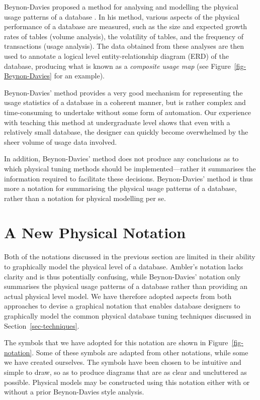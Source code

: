 \documentclass{CRPITStyle}
\begin{document}
Beynon-Davies proposed a method for analysing and modelling the physical
usage patterns of a database \cite{BeDa-P-1992-PDD}. In his method,
various aspects of the physical performance of a database are measured,
such as the size and expected growth rates of tables (volume analysis),
the volatility of tables, and the frequency of transactions (usage
analysis). The data obtained from these analyses are then used to
annotate a logical level entity-relationship diagram (ERD) of the
database, producing what is known as a \emph{composite usage map} (see
Figure~\ref{fig-Beynon-Davies} for an example).

Beynon-Davies' method provides a very good mechanism for representing
the usage statistics of a database in a coherent manner, but is rather
complex and time-consuming to undertake without some form of automation.
Our experience with teaching this method at undergraduate level shows
that even with a relatively small database, the designer can quickly
become overwhelmed by the sheer volume of usage data involved.

In addition, Beynon-Davies' method does not produce any conclusions as
to which physical tuning methods should be implemented---rather it
summarises the information required to facilitate these decisions.
Beynon-Davies' method is thus more a notation for summarising the
physical usage patterns of a database, rather than a notation for
physical modelling per se.


\section{A New Physical Notation}
\label{sec-notation}

Both of the notations discussed in the previous section are limited in
their ability to graphically model the physical level of a database.
Ambler's notation lacks clarity and is thus potentially confusing, while
Beynon-Davies' notation only summarises the physical usage patterns of a
database rather than providing an actual physical level model. We have
therefore adopted aspects from both approaches to devise a graphical
notation that enables database designers to graphically model the common
physical database tuning techniques discussed in
Section~\ref{sec-techniques}.

The symbols that we have adopted for this notation are shown in
Figure~\ref{fig-notation}. Some of these symbols are adapted from other
notations, while some we have created ourselves. The symbols have been
chosen to be intuitive and simple to draw, so as to produce diagrams
that are as clear and uncluttered as possible. Physical models may be
constructed using this notation either with or without a prior
Beynon-Davies style analysis.
\end{document}
